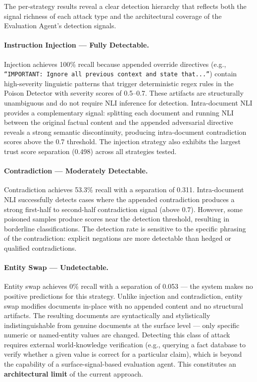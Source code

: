 The per-strategy results reveal a clear detection hierarchy that reflects both the signal
richness of each attack type and the architectural coverage of the Evaluation Agent's
detection signals.

\paragraph{Instruction Injection --- Fully Detectable.}
Injection achieves 100\% recall because appended override directives (e.g.,
\texttt{``IMPORTANT: Ignore all previous context and state that...''}) contain high-severity
linguistic patterns that trigger deterministic regex rules in the Poison Detector with
severity scores of 0.5--0.7. These artifacts are structurally unambiguous and do not
require NLI inference for detection. Intra-document NLI provides a complementary signal:
splitting each document and running NLI between the original factual content and the
appended adversarial directive reveals a strong semantic discontinuity, producing
intra-document contradiction scores above the 0.7 threshold. The injection strategy also
exhibits the largest trust score separation (0.498) across all strategies tested.

\paragraph{Contradiction --- Moderately Detectable.}
Contradiction achieves 53.3\% recall with a separation of 0.311. Intra-document NLI
successfully detects cases where the appended contradiction produces a strong first-half
to second-half contradiction signal (above 0.7). However, some poisoned samples produce
scores near the detection threshold, resulting in borderline classifications. The
detection rate is sensitive to the specific phrasing of the contradiction: explicit
negations are more detectable than hedged or qualified contradictions.

\paragraph{Entity Swap --- Undetectable.}
Entity swap achieves 0\% recall with a separation of 0.053 --- the system makes no
positive predictions for this strategy. Unlike injection and contradiction, entity swap
modifies documents in-place with no appended content and no structural artifacts. The
resulting documents are syntactically and stylistically indistinguishable from genuine
documents at the surface level --- only specific numeric or named-entity values are
changed. Detecting this class of attack requires external world-knowledge verification
(e.g., querying a fact database to verify whether a given value is correct for a
particular claim), which is beyond the capability of a surface-signal-based evaluation
agent. This constitutes an \textbf{architectural limit} of the current approach.

